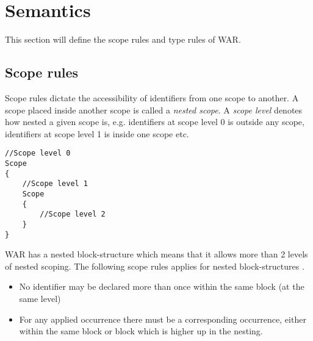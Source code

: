 \section{Semantics}
\label{sec:conanal}
This section will define the scope rules and type rules of WAR.
	\subsection{Scope rules}
		Scope rules dictate the accessibility of identifiers from one scope to another.
		A scope placed inside another scope is called a {\it nested scope}. A {\it scope level} denotes how nested a given scope is,
		e.g. identifiers at scope level 0 is outside any scope, identifiers at scope level 1 is inside one scope etc.
		\begin{lstlisting}
//Scope level 0
Scope
{
	//Scope level 1
	Scope
	{
		//Scope level 2
	}
}
		\end{lstlisting}
		
		WAR has a nested block-structure which means that it allows more than 2 levels of nested scoping. 
		The following scope rules applies for nested block-structures \cite{SPOBOG}.
			
	\begin{itemize}
	\item No identifier may be declared more than once within the same block (at the same level) %
	\item For any applied occurrence there must be a corresponding occurrence, either within the same block or block which is higher up in the nesting. 
	\end{itemize}
		
\newpage
	
